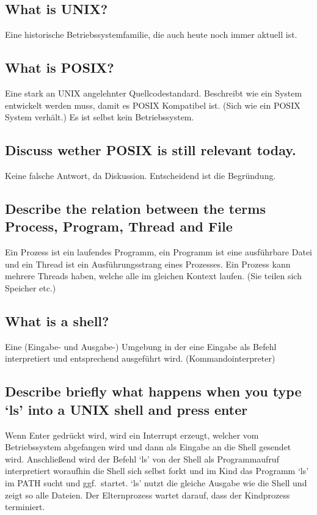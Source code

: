 \subsection{What is UNIX?}
Eine historische Betriebssystemfamilie, die auch heute noch immer aktuell ist.

\subsection{What is POSIX?}
Eine stark an UNIX angelehnter Quellcodestandard.
Beschreibt wie ein System entwickelt werden muss, damit es POSIX Kompatibel ist.
(Sich wie ein POSIX System verhält.)
Es ist selbst kein Betriebssystem.

\subsection{Discuss wether POSIX is still relevant today.}
Keine falsche Antwort, da Diskussion.
Entscheidend ist die Begründung.

\subsection{Describe the relation between the terms Process, Program, Thread and File}
Ein Prozess ist ein laufendes Programm, ein Programm ist eine ausführbare Datei und ein Thread ist ein Ausführungsstrang eines Prozesses.
Ein Prozess kann mehrere Threads haben, welche alle im gleichen Kontext laufen. (Sie teilen sich Speicher etc.)

\subsection{What is a shell?}
Eine (Eingabe- und Ausgabe-) Umgebung in der eine Eingabe als Befehl interpretiert und entsprechend ausgeführt wird.
(Kommandointerpreter)

\subsection{Describe briefly what happens when you type `ls' into a UNIX shell and press enter}
Wenn Enter gedrückt wird, wird ein Interrupt erzeugt, welcher vom Betriebssystem abgefangen wird und dann als Eingabe an die Shell gesendet wird.
Anschließend wird der Befehl `ls' von der Shell als Programmaufruf interpretiert woraufhin die Shell sich selbst forkt und im Kind das Programm `ls' im PATH sucht und ggf.\ startet.
`ls' nutzt die gleiche Ausgabe wie die Shell und zeigt so alle Dateien.
Der Elternprozess wartet darauf, dass der Kindprozess terminiert.

